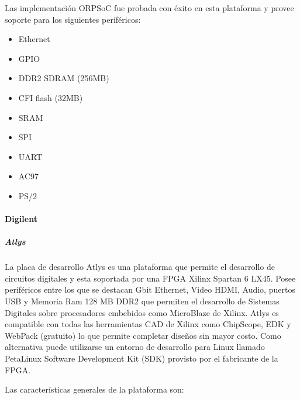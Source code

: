 				Las implementación ORPSoC fue probada con éxito en esta plataforma y provee soporte para los siguientes periféricos:
				
				\begin{itemize}
				  \item Ethernet
				  \item GPIO
				  \item DDR2 SDRAM (256MB)
				  \item CFI flash (32MB)
				  \item SRAM
				  \item SPI
				  \item UART
				  \item AC97 
				  \item PS/2 				
				\end{itemize}
			
				
				\paragraph{Digilent}
				\subparagraph{Atlys}
				La placa de desarrollo Atlys es una plataforma que permite el desarrollo de circuitos digitales y esta soportada por una FPGA Xilinx Spartan 6
				LX45. Posee periféricos entre los que se destacan Gbit Ethernet, Video HDMI, Audio, puertos USB y Memoria Ram 128 MB DDR2 que permiten el
				desarrollo de Sistemas Digitales sobre procesadores embebidos como  MicroBlaze de Xilinx. Atlys es compatible con todas las herramientas CAD de
				Xilinx como ChipScope, EDK y WebPack (gratuito) lo que permite completar diseños sin mayor costo. Como alternativa puede utilizarse un entorno de
				desarrollo para Linux llamado PetaLinux Software Development Kit (SDK) provisto por el fabricante de la FPGA.
				
				Las características generales de la plataforma son:
				
